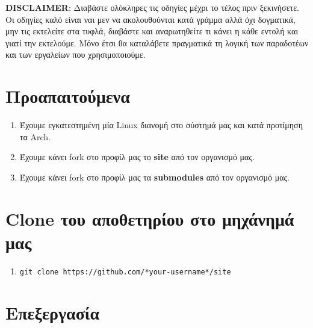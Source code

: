 \textbf{DISCLAIMER}: Διαβάστε ολόκληρες τις οδηγίες μέχρι το τέλος πριν
ξεκινήσετε. Οι οδηγίες καλό είναι ναι μεν να ακολουθούνται κατά γράμμα
αλλά όχι δογματικά, μην τις εκτελείτε στα τυφλά, διαβάστε και
αναρωτηθείτε τι κάνει η κάθε εντολή και γιατί την εκτελούμε. Μόνο έτσι
θα καταλάβετε πραγματικά τη λογική των παραδοτέων και των εργαλείων που
χρησιμοποιούμε.

\hypertarget{ux3c0ux3c1ux3bfux3b1ux3c0ux3b1ux3b9ux3c4ux3bfux3cdux3bcux3b5ux3bdux3b1}{%
\section{Προαπαιτούμενα}\label{ux3c0ux3c1ux3bfux3b1ux3c0ux3b1ux3b9ux3c4ux3bfux3cdux3bcux3b5ux3bdux3b1}}

\begin{enumerate}
\def\labelenumi{\arabic{enumi}.}
\tightlist
\item
  Έχουμε εγκατεστημένη μία Linux διανομή στο σύστημά μας και κατά
  προτίμηση τα Arch.
\item
  Έχουμε κάνει fork στο προφίλ μας το \textbf{site} από τον οργανισμό
  μας.
\item
  Έχουμε κάνει fork στο προφίλ μας τα \textbf{submodules} από τον
  οργανισμό μας.
\end{enumerate}

\hypertarget{clone-ux3c4ux3bfux3c5-ux3b1ux3c0ux3bfux3b8ux3b5ux3c4ux3b7ux3c1ux3afux3bfux3c5-ux3c3ux3c4ux3bf-ux3bcux3b7ux3c7ux3acux3bdux3b7ux3bcux3ac-ux3bcux3b1ux3c2}{%
\section{Clone του αποθετηρίου στο μηχάνημά
μας}\label{clone-ux3c4ux3bfux3c5-ux3b1ux3c0ux3bfux3b8ux3b5ux3c4ux3b7ux3c1ux3afux3bfux3c5-ux3c3ux3c4ux3bf-ux3bcux3b7ux3c7ux3acux3bdux3b7ux3bcux3ac-ux3bcux3b1ux3c2}}

\begin{enumerate}
\def\labelenumi{\arabic{enumi}.}
\tightlist
\item
  \texttt{git\ clone\ https://github.com/*your-username*/site}
\end{enumerate}

\hypertarget{ux3b5ux3c0ux3b5ux3beux3b5ux3c1ux3b3ux3b1ux3c3ux3afux3b1}{%
\section{Επεξεργασία}\label{ux3b5ux3c0ux3b5ux3beux3b5ux3c1ux3b3ux3b1ux3c3ux3afux3b1}}

